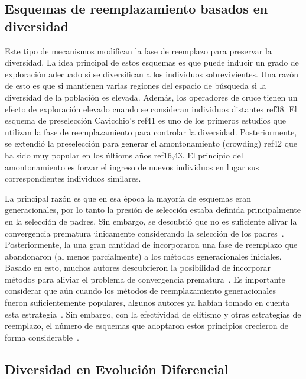 \subsection{Esquemas de reemplazamiento basados en diversidad}
Este tipo de mecanismos modifican la fase de reemplazo para preservar la diversidad.
%
La idea principal de estos esquemas es que puede inducir un grado de exploración adecuado si se diversifican a los individuos sobrevivientes.
%
Una razón de esto es que si mantienen varias regiones del espacio de búsqueda si la diversidad de la población es elevada.
%
Además, los operadores de cruce tienen un efecto de exploración elevado cuando se consideran individuos distantes ref38.
%
El esquema de preselección Cavicchio's ref41 es uno de los primeros estudios que utilizan la fase de reemplazamiento para controlar la diversidad.
%
Posteriormente, se extendió la preselección para generar el amontonamiento (crowding) ref42 que ha sido muy popular en los últioms años ref16,43.
%
El principio del amontonamiento es forzar el ingreso de nuevos individuos en lugar sus correspondientes individuos similares.
%

La principal razón es que en esa época la mayoría de esquemas eran generacionales, por lo tanto la presión de selección estaba definida principalmente en la selección de padres.
%
Sin embargo, se descubrió que no es suficiente alivar la convergencia prematura únicamente considerando la selección de los padres~\cite{blickle1996comparison}.
%
Posteriormente, la una gran cantidad de \EAS{} incorporaron una fase de reemplazo que abandonaron (al menos parcialmente) a los métodos generacionales iniciales.
%
Basado en esto, muchos autores descubrieron la posibilidad de incorporar métodos para aliviar el problema de convergencia prematura~\cite{Crepinsek:13}.
%
Es importante considerar que aún cuando los métodos de reemplazamiento generacionales~\cite{de2006evolutionary} fueron suficientemente populares, algunos autores ya habían tomado en cuenta esta estrategia~\cite{mahfoud1992crowding}.
%
Sin embargo, con la efectividad de elitismo y otras estrategias de reemplazo, el número de esquemas que adoptaron estos principios crecieron de forma considerable~\cite{lozano2008replacement}.
%
\subsection{Diversidad en Evolución Diferencial}

